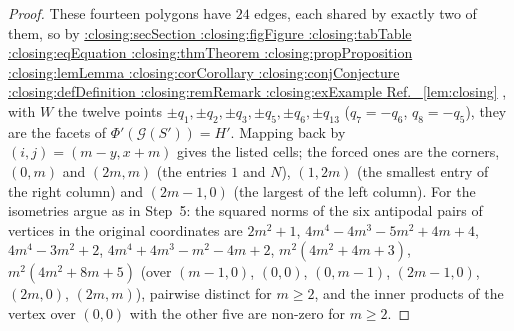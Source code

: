 \documentclass[11pt,a4paper]{article}
\makeatletter
\def\Cref@getprefix#1:#2\relax{#1}
\def\Cref@prefix@sec{sec}
\def\Cref@prefix@fig{fig}
\def\Cref@prefix@tab{tab}
\def\Cref@prefix@eq{eq}
\def\Cref@prefix@thm{thm}
\def\Cref@prefix@prop{prop}
\def\Cref@prefix@lem{lem}
\def\Cref@prefix@cor{cor}
\def\Cref@prefix@conj{conj}
\def\Cref@prefix@def{def}
\def\Cref@prefix@rem{rem}
\def\Cref@prefix@ex{ex}
\def\Cref@type@cap#1{%
  \edef\Cref@tmp{#1}%
  \ifx\Cref@tmp\Cref@prefix@sec Section%
  \else\ifx\Cref@tmp\Cref@prefix@fig Figure%
  \else\ifx\Cref@tmp\Cref@prefix@tab Table%
  \else\ifx\Cref@tmp\Cref@prefix@eq Equation%
  \else\ifx\Cref@tmp\Cref@prefix@thm Theorem%
  \else\ifx\Cref@tmp\Cref@prefix@prop Proposition%
  \else\ifx\Cref@tmp\Cref@prefix@lem Lemma%
  \else\ifx\Cref@tmp\Cref@prefix@cor Corollary%
  \else\ifx\Cref@tmp\Cref@prefix@conj Conjecture%
  \else\ifx\Cref@tmp\Cref@prefix@def Definition%
  \else\ifx\Cref@tmp\Cref@prefix@rem Remark%
  \else\ifx\Cref@tmp\Cref@prefix@ex Example%
  \else Ref.%
  \fi\fi\fi\fi\fi\fi\fi\fi\fi\fi\fi\fi
}
\DeclareRobustCommand{\Cref}[1]{%
  \begingroup
  \edef\Cref@label{#1}%
  \edef\Cref@prefix{\expandafter\Cref@getprefix\Cref@label:\relax}%
  \hyperref[#1]{\Cref@type@cap{\Cref@prefix}~\ref*{#1}}%
  \endgroup
}
\theoremstyle{plain}
\theoremstyle{definition}
\theoremstyle{remark}
\makeatother
\begin{document}
\begin{proof}
These fourteen polygons have $24$ edges, each shared by exactly two of them, so by \Cref{lem:closing}, with $W$ the twelve points $\pm q_1,\pm q_2,\pm q_3,\pm q_5,\pm q_6,\pm q_{13}$ ($q_7=-q_6$, $q_8=-q_5$), they are the facets of $\Phi'(\mathcal G(S'))=H'$.
Mapping back by $(i,j)=(m-y,x+m)$ gives the listed cells; the forced ones are the corners, $(0,m)$ and $(2m,m)$ (the entries $1$ and $N$), $(1,2m)$ (the smallest entry of the right column) and $(2m-1,0)$ (the largest of the left column).
For the isometries argue as in Step~5: the squared norms of the six antipodal pairs of vertices in the original coordinates are $2m^2+1$, $4m^4-4m^3-5m^2+4m+4$, $4m^4-3m^2+2$, $4m^4+4m^3-m^2-4m+2$, $m^2(4m^2+4m+3)$, $m^2(4m^2+8m+5)$ (over $(m-1,0)$, $(0,0)$, $(0,m-1)$, $(2m-1,0)$, $(2m,0)$, $(2m,m)$), pairwise distinct for $m\ge2$, and the inner products of the vertex over $(0,0)$ with the other five are non-zero for $m\ge2$.
\end{proof}
\end{document}
